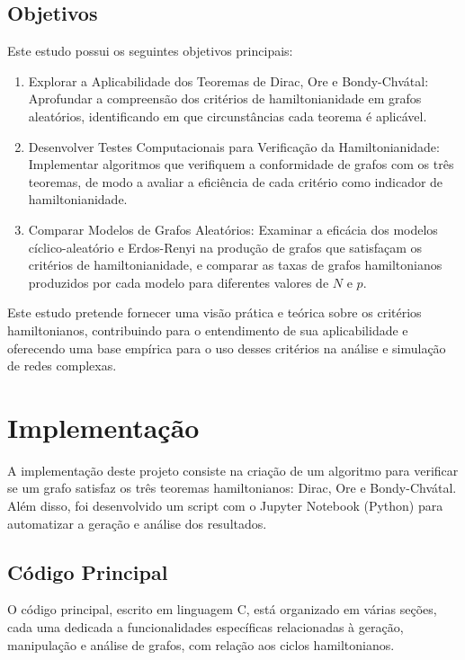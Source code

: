 \documentclass[12pt, openright, oneside, a4paper, chapter=TITLE, section=TITLE, subsection=TITLE, subsubsection=TITLE, brazil]{abntex2}
\begin{document}
\section{Objetivos}
Este estudo possui os seguintes objetivos principais:
\begin{enumerate}
    \item Explorar a Aplicabilidade dos Teoremas de Dirac, Ore e Bondy-Chvátal: Aprofundar a compreensão dos critérios de hamiltonianidade em grafos aleatórios, identificando em que circunstâncias cada teorema é aplicável.
    \item Desenvolver Testes Computacionais para Verificação da Hamiltonianidade: Implementar algoritmos que verifiquem a conformidade de grafos com os três teoremas, de modo a avaliar a eficiência de cada critério como indicador de hamiltonianidade.
    \item Comparar Modelos de Grafos Aleatórios: Examinar a eficácia dos modelos cíclico-aleatório e Erdos-Renyi na produção de grafos que satisfaçam os critérios de hamiltonianidade, e comparar as taxas de grafos hamiltonianos produzidos por cada modelo para diferentes valores de $N$ e $p$.
\end{enumerate}
\hspace{1.25cm}Este estudo pretende fornecer uma visão prática e teórica sobre os critérios hamiltonianos, contribuindo para o entendimento de sua aplicabilidade e oferecendo uma base empírica para o uso desses critérios na análise e simulação de redes complexas.

\chapter{Implementação}
\hspace{1.25cm}A implementação deste projeto consiste na criação de um algoritmo para verificar se um grafo satisfaz os três teoremas hamiltonianos: Dirac, Ore e Bondy-Chvátal. Além disso, foi desenvolvido um script com o Jupyter Notebook (Python) para automatizar a geração e análise dos resultados.

\section{Código Principal}
\hspace{1.25cm}O código principal, escrito em linguagem C, está organizado em várias seções, cada uma dedicada a funcionalidades específicas relacionadas à geração, manipulação e análise de grafos, com relação aos ciclos hamiltonianos.
\end{document}
